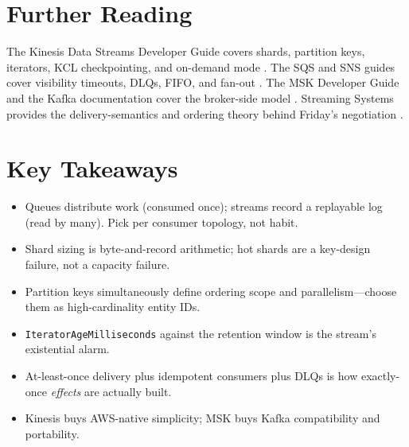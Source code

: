 \section{Further Reading}
The Kinesis Data Streams Developer Guide covers shards, partition keys, iterators, KCL checkpointing, and on-demand mode \cite{awsKinesisDocs}. The SQS and SNS guides cover visibility timeouts, DLQs, FIFO, and fan-out \cite{awsSQSDocs,awsSNSDocs}. The MSK Developer Guide and the Kafka documentation cover the broker-side model \cite{awsMSKDocs,apacheKafkaProject}. Streaming Systems provides the delivery-semantics and ordering theory behind Friday's negotiation \cite{akidauStreamingSystems}.

\section*{Key Takeaways}
\begin{itemize}
    \item Queues distribute work (consumed once); streams record a replayable log (read by many). Pick per consumer topology, not habit.
    \item Shard sizing is byte-and-record arithmetic; hot shards are a key-design failure, not a capacity failure.
    \item Partition keys simultaneously define ordering scope and parallelism---choose them as high-cardinality entity IDs.
    \item \texttt{IteratorAgeMilliseconds} against the retention window is the stream's existential alarm.
    \item At-least-once delivery plus idempotent consumers plus DLQs is how exactly-once \emph{effects} are actually built.
    \item Kinesis buys AWS-native simplicity; MSK buys Kafka compatibility and portability.
\end{itemize}

